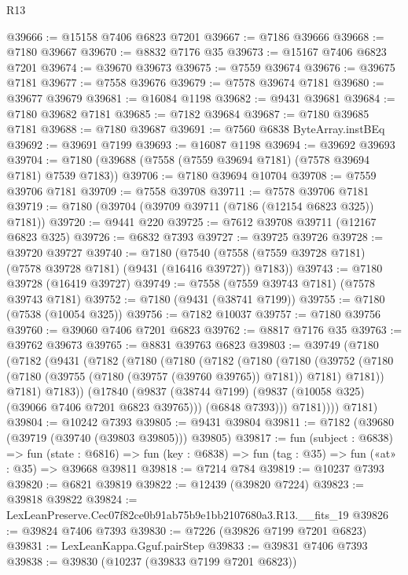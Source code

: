 \begin{lexlean}{R13}
\begin{coremodule}
@39666 := @15158 @7406 @6823 @7201
@39667 := @7186 @39666
@39668 := @7180 @39667
@39670 := @8832 @7176 @35
@39673 := @15167 @7406 @6823 @7201
@39674 := @39670 @39673
@39675 := @7559 @39674
@39676 := @39675 @7181
@39677 := @7558 @39676
@39679 := @7578 @39674 @7181
@39680 := @39677 @39679
@39681 := @16084 @1198
@39682 := @9431 @39681
@39684 := @7180 @39682 @7181
@39685 := @7182 @39684
@39687 := @7180 @39685 @7181
@39688 := @7180 @39687
@39691 := @7560 @6838 ByteArray.instBEq
@39692 := @39691 @7199
@39693 := @16087 @1198
@39694 := @39692 @39693
@39704 := @7180 (@39688 (@7558 (@7559 @39694 @7181) (@7578 @39694 @7181) @7539 @7183))
@39706 := @7180 @39694 @10704
@39708 := @7559 @39706 @7181
@39709 := @7558 @39708
@39711 := @7578 @39706 @7181
@39719 := @7180 (@39704 (@39709 @39711 (@7186 (@12154 @6823 @325)) @7181))
@39720 := @9441 @220
@39725 := @7612 @39708 @39711 (@12167 @6823 @325)
@39726 := @6832 @7393
@39727 := @39725 @39726
@39728 := @39720 @39727
@39740 := @7180
    (@7540 (@7558 (@7559 @39728 @7181) (@7578 @39728 @7181) (@9431 (@16416 @39727)) @7183))
@39743 := @7180 @39728 (@16419 @39727)
@39749 := @7558 (@7559 @39743 @7181) (@7578 @39743 @7181)
@39752 := @7180 (@9431 (@38741 @7199))
@39755 := @7180 (@7538 (@10054 @325))
@39756 := @7182 @10037
@39757 := @7180 @39756
@39760 := @39060 @7406 @7201 @6823
@39762 := @8817 @7176 @35
@39763 := @39762 @39673
@39765 := @8831 @39763 @6823
@39803 := @39749
    (@7180
      (@7182
        (@9431
          (@7182
            (@7180
              (@7180
                (@7182
                  (@7180
                    (@7180
                      (@39752
                        (@7180 (@7180 (@39755 (@7180 (@39757 (@39760 @39765)) @7181)) @7181) @7181))
                      @7181)
                    @7183))
                (@17840
                  (@9837 (@38744 @7199) (@9837 (@10058 @325) (@39066 @7406 @7201 @6823 @39765)))
                  (@6848 @7393)))
              @7181))))
      @7181)
@39804 := @10242 @7393
@39805 := @9431 @39804
@39811 := @7182 (@39680 (@39719 (@39740 (@39803 @39805))) @39805)
@39817 := fun (subject : @6838) =>
  fun (state : @6816) => fun (key : @6838) => fun (tag : @35) => fun («at» : @35) => @39668 @39811
@39818 := @7214 @784
@39819 := @10237 @7393
@39820 := @6821 @39819
@39822 := @12439 (@39820 @7224)
@39823 := @39818 @39822
@39824 := LexLeanPreserve.Cec07f82ce0b91ab75b9e1bb2107680a3.R13.__fits_19
@39826 := @39824 @7406 @7393
@39830 := @7226 (@39826 @7199 @7201 @6823)
@39831 := LexLeanKappa.Gguf.pairStep
@39833 := @39831 @7406 @7393
@39838 := @39830 (@10237 (@39833 @7199 @7201 @6823))

\end{coremodule}
\end{lexlean}
